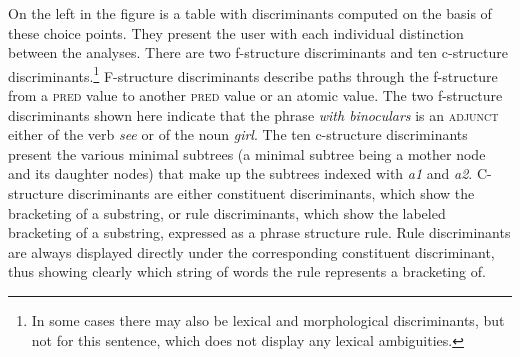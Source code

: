 \documentclass[output=paper,hidelinks]{langscibook}
\begin{document}


On the left in the figure is a table with discriminants computed on the basis of these choice points.
They present the user with each individual distinction between the analyses.
There are two f-structure discriminants and ten c-structure discriminants.\footnote{In some cases there may also be lexical and morphological discriminants, but not for this sentence, which does not display any lexical ambiguities.}
F-structure discriminants describe paths through the f-structure from a \textsc{pred} value to another \textsc{pred} value or an atomic value.
The two f-structure discriminants shown here indicate that the phrase \textit{with binoculars} is an \textsc{adjunct} either of the verb \textit{see} or of the noun \textit{girl}.
The ten c-structure discriminants present the various minimal subtrees (a minimal subtree being a mother node and its daughter nodes) that make up the subtrees indexed with \textit{a1} and \textit{a2}.
C-structure discriminants are either constituent discriminants, which show the bracketing of a substring, or rule discriminants, which show the labeled bracketing of a substring, expressed as a phrase structure rule.
Rule discriminants are always displayed directly under the corresponding constituent discriminant, thus showing clearly which string of words the rule represents a bracketing of.
\end{document}
